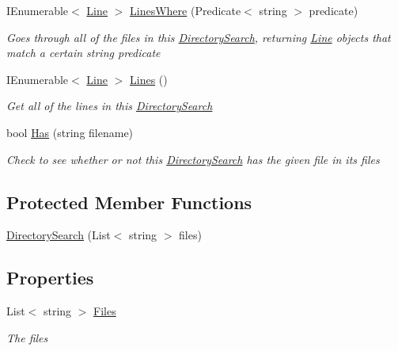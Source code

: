 \begin{DoxyCompactItemize}
I\+Enumerable$<$ \hyperlink{classHumDrum_1_1Operations_1_1Files_1_1Line}{Line} $>$ \hyperlink{classHumDrum_1_1Operations_1_1Files_1_1DirectorySearch_a34bffb903db014a0d91d7b1faae3b387}{Lines\+Where} (Predicate$<$ string $>$ predicate)
\begin{DoxyCompactList}\small\item\em Goes through all of the files in this \hyperlink{classHumDrum_1_1Operations_1_1Files_1_1DirectorySearch}{Directory\+Search}, returning \hyperlink{classHumDrum_1_1Operations_1_1Files_1_1Line}{Line} objects that match a certain string predicate \end{DoxyCompactList}\item 
I\+Enumerable$<$ \hyperlink{classHumDrum_1_1Operations_1_1Files_1_1Line}{Line} $>$ \hyperlink{classHumDrum_1_1Operations_1_1Files_1_1DirectorySearch_a97721cf17c7a08ca86cc1692cc0543fd}{Lines} ()
\begin{DoxyCompactList}\small\item\em Get all of the lines in this \hyperlink{classHumDrum_1_1Operations_1_1Files_1_1DirectorySearch}{Directory\+Search} \end{DoxyCompactList}\item 
bool \hyperlink{classHumDrum_1_1Operations_1_1Files_1_1DirectorySearch_acd1d24435e4213a0b6637dcfcb0ae912}{Has} (string filename)
\begin{DoxyCompactList}\small\item\em Check to see whether or not this \hyperlink{classHumDrum_1_1Operations_1_1Files_1_1DirectorySearch}{Directory\+Search} has the given file in its files \end{DoxyCompactList}\end{DoxyCompactItemize}
\subsection*{Protected Member Functions}
\begin{DoxyCompactItemize}
\item 
\hyperlink{classHumDrum_1_1Operations_1_1Files_1_1DirectorySearch_ad00c0c8f19b6a6e26aa50c4521a5dba4}{Directory\+Search} (List$<$ string $>$ files)
\end{DoxyCompactItemize}
\subsection*{Properties}
\begin{DoxyCompactItemize}
\item 
List$<$ string $>$ \hyperlink{classHumDrum_1_1Operations_1_1Files_1_1DirectorySearch_ae7bda27ea2f731ad9bbc04ae27d48fa9}{Files}
\begin{DoxyCompactList}\small\item\em The files \end{DoxyCompactList}\end{DoxyCompactItemize}


